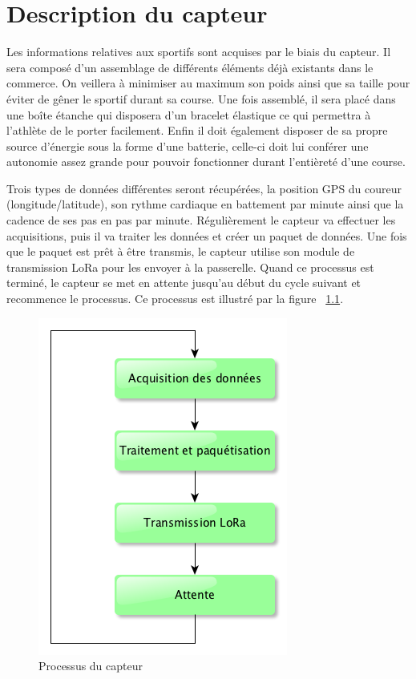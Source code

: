 \chapter{Description du capteur} \label{desc_capteur}

Les informations relatives aux sportifs sont acquises par le biais du capteur. Il sera composé d’un assemblage de différents éléments déjà existants dans le commerce. On veillera à minimiser au maximum son poids ainsi que sa taille pour éviter de gêner le sportif durant sa course. Une fois assemblé, il sera placé dans une boîte étanche qui disposera d’un bracelet élastique ce qui permettra à l’athlète de le porter facilement. Enfin il doit également disposer de sa propre source d’énergie sous la forme d’une batterie, celle-ci doit lui conférer une autonomie assez grande pour pouvoir fonctionner durant l’entièreté d’une course.

Trois types de données différentes seront récupérées, la position GPS du coureur (longitude/latitude), son rythme cardiaque en battement par minute ainsi que la cadence de ses pas en pas par minute. Régulièrement le capteur va effectuer les acquisitions, puis il va traiter les données et créer un paquet de données. Une fois que le paquet est prêt à être transmis, le capteur utilise son module de transmission LoRa pour les envoyer à la passerelle. Quand ce processus est terminé, le capteur se met en attente jusqu’au début du cycle suivant et recommence le processus. Ce processus est illustré par la figure ~\ref{fig:proc_capteur}.

\begin{figure}[htb]
\centering 
\includegraphics[width=0.4\columnwidth]{../images/capteur_flowchart.png} 
\caption[Processus Capteur]{Processus du capteur}
\label{fig:proc_capteur}
\end{figure}

